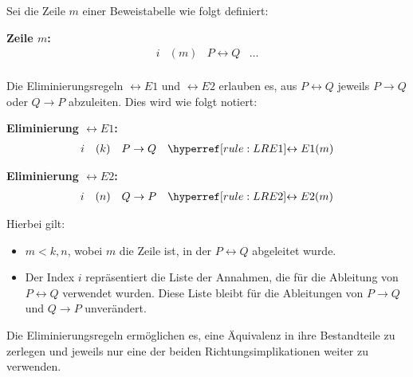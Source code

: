 \documentclass[main.tex]{subfiles}
\begin{document}
\begin{definition}
Sei die Zeile \(m\) einer Beweistabelle wie folgt definiert:

\textbf{Zeile \(m\):}
\[
\begin{array}{llll}
    i & (m) & P \leftrightarrow Q & \dots \\
\end{array}
\]

Die Eliminierungsregeln \(\leftrightarrow E1\) und \(\leftrightarrow E2\) erlauben es, aus \(P \leftrightarrow Q\) jeweils \(P \rightarrow Q\) oder \(Q \rightarrow P\) abzuleiten. Dies wird wie folgt notiert:

\textbf{Eliminierung \(\leftrightarrow E1\):}
\[
\begin{array}{llll}
    i & (k) & P \rightarrow Q & \rLREa{m} \\
\end{array}
\]

\textbf{Eliminierung \(\leftrightarrow E2\):}
\[
\begin{array}{llll}
    i & (n) & Q \rightarrow P & \rLREb{m} \\
\end{array}
\]

Hierbei gilt:
\begin{itemize}
    \item \(m < k, n\), wobei \(m\) die Zeile ist, in der \(P \leftrightarrow Q\) abgeleitet wurde.
    \item Der Index \(i\) repräsentiert die Liste der Annahmen, die für die Ableitung von \(P \leftrightarrow Q\) verwendet wurden. Diese Liste bleibt für die Ableitungen von \(P \rightarrow Q\) und \(Q \rightarrow P\) unverändert.
\end{itemize}

Die Eliminierungsregeln ermöglichen es, eine Äquivalenz in ihre Bestandteile zu zerlegen und jeweils nur eine der beiden Richtungsimplikationen weiter zu verwenden.
\end{definition}
\end{document}
